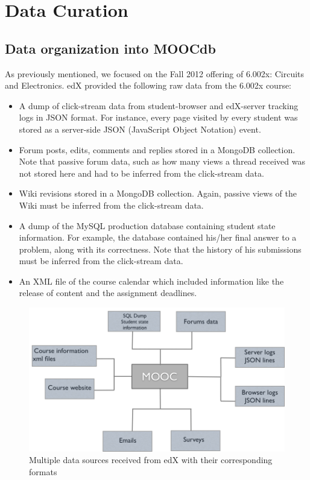 \chapter{Data Curation}\label{chap:data}

\section{Data organization into MOOCdb}

As previously mentioned, we focused on the Fall 2012 offering of 6.002x: Circuits and Electronics. edX provided the following raw data from the 6.002x course:

\begin{itemize}
\item A dump of click-stream data from student-browser and edX-server tracking logs in JSON format. For instance, every page visited by every student was stored as a server-side JSON (JavaScript Object Notation) event.
\item Forum posts, edits, comments and replies stored in a MongoDB collection. Note that passive forum data, such as how many views a thread received was not stored here and had to be inferred from the click-stream data.
\item Wiki revisions stored in a MongoDB collection. Again, passive views of the Wiki must be inferred from the click-stream data.
\item A dump of the MySQL production database containing student state information. For example, the database contained his/her final answer to a problem, along with its correctness. Note that the history of his submissions must be inferred from the click-stream data.
\item An XML file of the course calendar which included information like the release of content and the assignment deadlines.
\end{itemize}

\begin{figure}[ht!]
  \caption{Multiple data sources received from edX with their corresponding formats}\label{fig:data_layout}
  \centering
    \includegraphics[width=1.0\textwidth]{figures/data_layout.png}
\end{figure}

